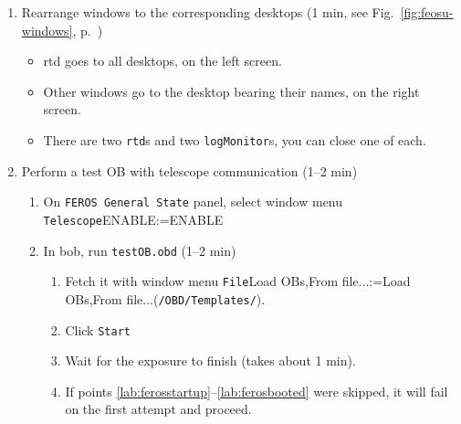 \documentclass[11pt,fleqn]{book}
\makeatletter
\def\menu#1#2{\texttt{#1}\ifx{}#2\else\@for\@x:=#2\do{$\rightarrow$\texttt{\@x}}\fi}
\def\wmenu#1#2{window menu \menu{#1}{#2}}
\def\fetchob{\wmenu{File}{Load OBs,From file...}}
\def\figref#1{Fig.~\ref{fig:#1}, p.~\pageref{fig:#1}}
\def\secref#1{Sect.~\ref{sec:#1}, p.~\pageref{sec:#1}}
\makeatother
\begin{document}
\begin{enumerate}
\begin{enumerate}
\begin{enumerate}
                \item A large, grey window giving details on the process should open.\\If a timeout error occurs, see \secref{ferosstartuptimeout}.    
                \item Wait for the large, grey window to close itself (3 min)
                \item\label{lab:ferosonline} Put the instrument online (1 min)
                \begin{enumerate}
                   \item On \texttt{FEROS General State} panel, use \wmenu{Instrument}{ONLINE}
                   \item Wait for \texttt{State} to indicate \texttt{ONLINE}
                \end{enumerate}
            \end{enumerate}
         \item \label{lab:ferosbooted} Rearrange windows to the corresponding desktops (1 min, see \figref{feosu-windows})
            \begin{itemize}
              \item \gls{rtd} goes to all desktops, on the left screen.
              \item Other windows go to the desktop bearing their names, on the right screen.
              \item There are two \texttt{rtd}s and two \texttt{logMonitor}s, you can close one of each.
           \end{itemize}
         \item Perform a test OB with telescope communication (1--2 min)
           \begin{enumerate}
             \item On \texttt{FEROS General State} panel, select \wmenu{Telescope}{ENABLE} 
             \item In \gls{bob}, run \texttt{testOB.obd} (1--2 min)
             \begin{enumerate}
               \item Fetch it with \fetchob (\texttt{/OBD/Templates/}).
               \item \label{list:ferostestob} Click \texttt{Start} 
               \item Wait for the exposure to finish (takes about 1 min).
               \item If points \ref{lab:ferosstartup}--\ref{lab:ferosbooted} were skipped, it will fail on the first attempt and proceed.

\end{enumerate}
\end{enumerate}
\end{enumerate}
\end{enumerate}
\end{document}
